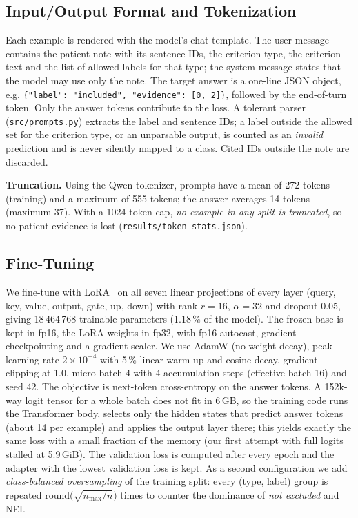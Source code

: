 \subsection{Input/Output Format and Tokenization}
Each example is rendered with the model's chat template. The user message contains the patient note with its sentence IDs, the criterion type, the criterion text and the list of allowed labels for that type; the system message states that the model may use only the note. The target answer is a one-line JSON object, e.g. \texttt{\{"label": "included", "evidence": [0, 2]\}}, followed by the end-of-turn token. Only the answer tokens contribute to the loss. A tolerant parser (\texttt{src/prompts.py}) extracts the label and sentence IDs; a label outside the allowed set for the criterion type, or an unparsable output, is counted as an \emph{invalid} prediction and is never silently mapped to a class. Cited IDs outside the note are discarded.

\textbf{Truncation.} Using the Qwen tokenizer, prompts have a mean of 272 tokens (training) and a maximum of 555 tokens; the answer averages 14 tokens (maximum 37). With a 1024-token cap, \emph{no example in any split is truncated}, so no patient evidence is lost (\texttt{results/token\_stats.json}).

\subsection{Fine-Tuning}
We fine-tune with LoRA~\cite{hu2022lora} on all seven linear projections of every layer (query, key, value, output, gate, up, down) with rank $r=16$, $\alpha=32$ and dropout 0.05, giving 18\,464\,768 trainable parameters (1.18\,\% of the model). The frozen base is kept in fp16, the LoRA weights in fp32, with fp16 autocast, gradient checkpointing and a gradient scaler. We use AdamW (no weight decay), peak learning rate $2\times10^{-4}$ with 5\,\% linear warm-up and cosine decay, gradient clipping at 1.0, micro-batch 4 with 4 accumulation steps (effective batch 16) and seed 42. The objective is next-token cross-entropy on the answer tokens. A 152k-way logit tensor for a whole batch does not fit in 6\,GB, so the training code runs the Transformer body, selects only the hidden states that predict answer tokens (about 14 per example) and applies the output layer there; this yields exactly the same loss with a small fraction of the memory (our first attempt with full logits stalled at 5.9\,GiB). The validation loss is computed after every epoch and the adapter with the lowest validation loss is kept. As a second configuration we add \emph{class-balanced oversampling} of the training split: every (type, label) group is repeated $\text{round}\bigl(\sqrt{n_\text{max}/n}\bigr)$ times to counter the dominance of \emph{not excluded} and NEI.

